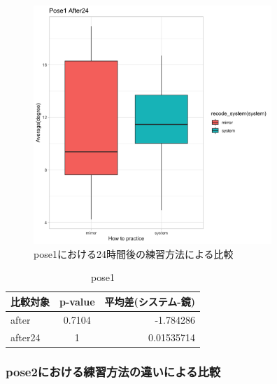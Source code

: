       \begin{figure}[H]
        \begin{center}
        \includegraphics[width=9cm]{figures/pose1_after24_boxplot.png}
        \caption{pose1における24時間後の練習方法による比較}
        \label{fig:pose1_after24_practice}
        \end{center}
      \end{figure}

      \begin{table}[H]
        \centering
        \caption{pose1}
        \begin{tabular}{lcr}
        \hline
        \textbf{比較対象} & \textbf{p-value} & \textbf{平均差(システム-鏡)} \\ \hline
        after & 0.7104 & -1.784286\\ \hline
        after24 & 1 & 0.01535714\\ \hline
        \end{tabular}
        \label{table:pose1_practice_p_value}
        \end{table}
      
    \subsubsection{pose2における練習方法の違いによる比較}

